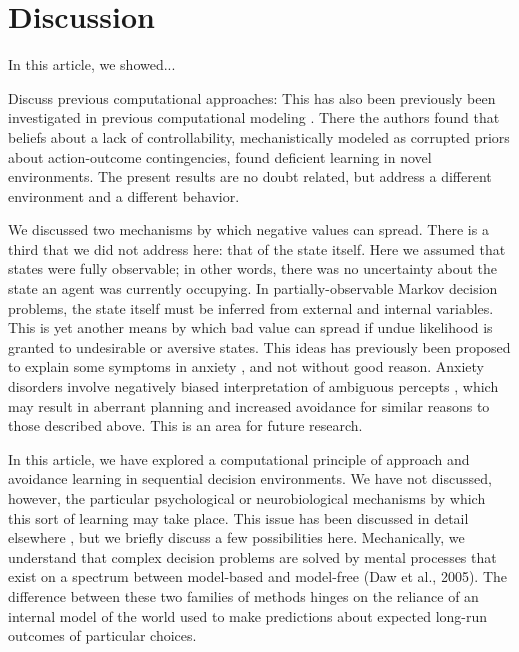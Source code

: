 \documentclass[11pt]{article} %
\begin{document}
\section{Discussion}

In this article, we showed...

Discuss previous computational approaches: This has also been previously been
investigated in previous computational modeling \citep{HuysDayan2009}. There
the authors found that beliefs about a lack of controllability, mechanistically
modeled as corrupted priors about action-outcome contingencies, found deficient
learning in novel environments. The present results are no doubt related, but
address a different environment and a different behavior.

We discussed two mechanisms by which negative values can spread. There is a third
that we did not address here: that of the state itself. Here we assumed that states
were fully observable; in other words, there was no uncertainty about the state
an agent was currently occupying. In partially-observable Markov decision problems,
the state itself must be inferred from external and internal variables. This is
yet another means by which bad value can spread if undue likelihood is granted
to undesirable or aversive states. This ideas has previously been proposed to
explain some symptoms in anxiety \citep{Paulus2012}, and not without good reason.
Anxiety disorders involve negatively biased interpretation of ambiguous percepts
\citep{Hartley2012}, which may result in aberrant planning and increased avoidance
for similar reasons to those described above. This is an area for future research.

In this article, we have explored a computational principle of approach and
avoidance learning in sequential decision environments. We have not discussed,
however, the particular psychological or neurobiological mechanisms by which this
sort of learning may take place. This issue has been discussed in detail elsewhere
\citep{Bishop2018}, but we briefly discuss a few possibilities here. Mechanically,
we understand that complex decision problems are solved by mental processes that
exist on a spectrum between model-based and model-free (Daw et al., 2005). The
difference between these two families of methods hinges on the reliance of an
internal model of the world used to make predictions about expected long-run
outcomes of particular choices.
\end{document}

